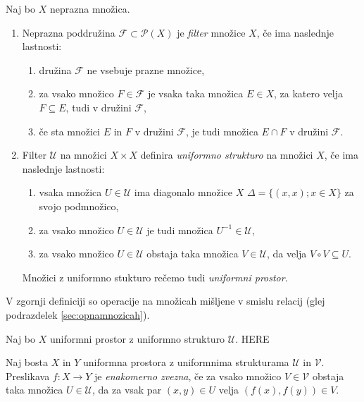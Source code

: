 \documentclass[mat1]{fmfdelo}
\begin{document}
\begin{definicija}\label{def:uniform}
Naj bo $X$ neprazna množica.
\begin{enumerate}
\item Neprazna poddružina $\mathcal{F} \subset \mathcal{P}(X)$ je \emph{filter} množice $X$, če ima naslednje lastnosti:
\begin{enumerate}
\item družina $\mathcal{F}$ ne vsebuje prazne množice,
\item za vsako množico $F \in \mathcal{F}$ je vsaka taka množica $E \in X$, za katero velja $F \subseteq E$, tudi v družini $\mathcal{F}$,
\item če sta množici $E$ in $F$ v družini $\mathcal{F}$, je tudi množica $E \cap F$ v družini $\mathcal{F}$.
\end{enumerate}
\item Filter $\mathcal{U}$ na množici $X \times X$ definira \emph{uniformno strukturo} na množici $X$, če ima naslednje lastnosti:
\begin{enumerate}
\item vsaka množica $U \in \mathcal{U}$ ima diagonalo množice $X$ $\Delta = \lbrace (x, x) ; x \in X \rbrace$ za svojo podmnožico,
\item za vsako množico $U \in \mathcal{U}$ je tudi množica $U^{-1} \in \mathcal{U}$,
\item za vsako množico $U \in \mathcal{U}$ obstaja taka množica $V \in \mathcal{U}$, da velja $V \circ V \subseteq U$.
\end{enumerate}
Množici z uniformno stukturo rečemo tudi \emph{uniformni prostor}.
\end{enumerate}
\end{definicija}

\begin{opomba}
V zgornji definiciji so operacije na množicah mišljene v smislu relacij (glej podrazdelek \ref{sec:opnamnozicah}).
\end{opomba}

\begin{definicija}
Naj bo $X$ uniformni prostor z uniformno strukturo $\mathcal{U}$. HERE
\end{definicija}

\begin{definicija}\label{def:enakzveznost}
Naj bosta $X$ in $Y$ uniformna prostora z uniformnima strukturama $\mathcal{U}$ in $\mathcal{V}$. Preslikava $f: X \to Y$ je \emph{enakomerno zvezna}, če za vsako množico $V \in \mathcal{V}$ obstaja taka množica $U \in \mathcal{U}$, da za vsak par $(x, y) \in U$ velja $(f(x), f(y)) \in V$.
\end{definicija}
\end{document}
